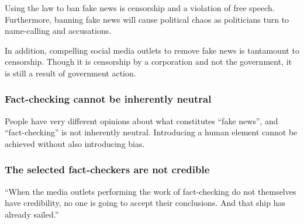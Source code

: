 \par Using the law to ban fake news is censorship and a violation of free speech. Furthermore, banning fake news will cause political chaos as politicians turn to name-calling and accusations. \cite{eff_bill}
\par In addition, compelling social media outlets to remove fake news is tantamount to censorship. Though it is censorship by a corporation and not the government, it is still a result of government action. \cite{wp_germany}

\subsubsection{Fact-checking cannot be inherently neutral}

\par People have very different opinions about what constitutes ``fake news'', and ``fact-checking'' is not inherently neutral. Introducing a human element cannot be achieved without also introducing bias. \cite{vox_sentences}

\subsubsection{The selected fact-checkers are not credible}

\par ``When the media outlets performing the work of fact-checking do not themselves have credibility, no one is going to accept their conclusions. And that ship has already sailed.'' \cite{vox_sentences}

%
\vfill